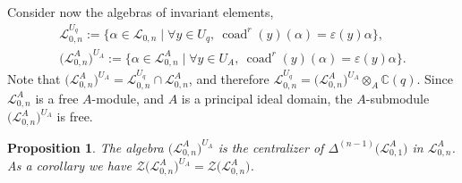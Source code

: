 \documentclass[pdftex]{sigma}%
\numberwithin{equation}{section}
\numberwithin{figure}{section}
\newtheorem{prop}[teo]{Proposition}
\newcommand{\mc}{\mathbb{C}}
\newcommand{\Ll}{{\mathcal L}}
\begin{document}
Consider now the algebras of invariant elements,
\begin{gather*}
\Ll_{0,n}^{U_q} :=\big\{\alpha \in \Ll_{0,n}\mid \forall y \in U_q,\ \operatorname{coad}^r(y)(\alpha) = \varepsilon(y)\alpha\big\},
\\
\big(\Ll_{0,n}^A\big)^{U_A} :=\big\{\alpha \in \Ll_{0,n}^A\mid \forall y \in U_A,\ \operatorname{coad}^r(y)(\alpha) = \varepsilon(y)\alpha\big\}.
\end{gather*}
Note that $\big(\Ll_{0,n}^A\big)^{U_A} = \Ll_{0,n}^{U_q} \cap \Ll_{0,n}^A$, and therefore $\Ll_{0,n}^{U_q} = \big(\Ll_{0,n}^A\big)^{U_A} \otimes_A \mc(q)$. Since $\Ll_{0,n}^A$ is a free $A$-module, and $A$ is a principal ideal domain, the $A$-submodule $\big(\Ll_{0,n}^A\big)^{U_A}$ is free.
\begin{prop} \label{invL0n} The algebra $\big(\Ll_{0,n}^A\big)^{U_A}$ is the centralizer of $\Delta^{(n-1)}\big(\Ll_{0,1}^A\big)$ in $\Ll_{0,n}^A$. As a corollary we have
$\mathcal{Z}\big(\Ll_{0,n}^A\big)^{U_A} = \mathcal{Z}\big(\Ll_{0,n}^A\big)$.
\end{prop}
\end{document}
